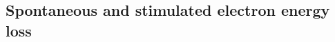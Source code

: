 \documentclass[aps,prb,twocolumn,
	groupedaddress,superscriptaddress,
	amsfonts,amssymb,amsmath,floatfix,
	citeautoscript]{revtex4-1}
\begin{document}
\subsection{Spontaneous and stimulated electron energy loss}

%
%
\end{document}
